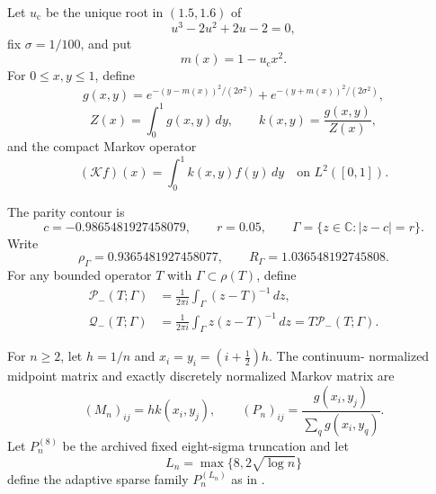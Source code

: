 \documentclass[11pt]{article}
\theoremstyle{definition}
\theoremstyle{remark}
\newcommand{\C}{\mathbb C}
\newcommand{\cK}{\mathcal K}
\newcommand{\cQ}{\mathcal Q}
\newcommand{\cP}{\mathcal P}
\newcommand{\uc}{u_{\mathrm c}}
\begin{document}
Let $\uc$ be the unique root in $(1.5,1.6)$ of
\[
 u^3-2u^2+2u-2=0,
\]
fix $\sigma=1/100$, and put
\[
 m(x)=1-\uc x^2.
\]
For $0\le x,y\le1$, define
\[
 g(x,y)=
 e^{-(y-m(x))^2/(2\sigma^2)}
 +e^{-(y+m(x))^2/(2\sigma^2)},
\]
\[
 Z(x)=\int_0^1g(x,y)\,dy,
 \qquad
 k(x,y)=\frac{g(x,y)}{Z(x)},
\]
and the compact Markov operator
\begin{equation}
 (\cK f)(x)=\int_0^1k(x,y)f(y)\,dy
 \quad\text{on }L^2([0,1]).
 \label{eq:continuum-operator}
\end{equation}

The parity contour is
\begin{equation}
 c=-0.9865481927458079,
 \qquad r=0.05,
 \qquad \Gamma=\{z\in\C:|z-c|=r\}.
 \label{eq:contour}
\end{equation}
Write
\[
 \rho_\Gamma=0.9365481927458077,
 \qquad R_\Gamma=1.036548192745808.
\]
For any bounded operator $T$ with $\Gamma\subset\rho(T)$, define
\begin{align}
 \cP_-(T;\Gamma)
 &=\frac{1}{2\pi i}\int_\Gamma(z-T)^{-1}\,dz,
 \label{eq:riesz-projection}\\
 \cQ_-(T;\Gamma)
 &=\frac{1}{2\pi i}\int_\Gamma z(z-T)^{-1}\,dz
 =T\cP_-(T;\Gamma).
 \label{eq:weighted-riesz}
\end{align}

For $n\ge2$, let $h=1/n$ and $x_i=y_i=(i+\tfrac12)h$.  The continuum-
normalized midpoint matrix and exactly discretely normalized Markov matrix
are
\begin{equation}
 (M_n)_{ij}=h k(x_i,y_j),
 \qquad
 (P_n)_{ij}=\frac{g(x_i,y_j)}{\sum_qg(x_i,y_q)}.
 \label{eq:matrix-families}
\end{equation}
Let $P_n^{(8)}$ be the archived fixed eight-sigma truncation and let
\begin{equation}
 L_n=\max\{8,2\sqrt{\log n}\}
 \label{eq:adaptive-schedule}
\end{equation}
define the adaptive sparse family $P_n^{(L_n)}$ as in
\citet{WangCutoff2026,WangEuclidean2026}.
\end{document}
